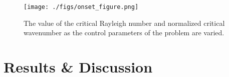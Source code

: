 \documentclass[twocolumn]{aastex61}
\begin{document}
\begin{figure}
\centering
\texttt{[image: ./figs/onset\_figure.png]}
\caption{The value of the critical Rayleigh number and normalized critical wavenumber
as the control parameters of the problem are varied. \label{fig:onset_curves}}
\end{figure}


\section{Results \& Discussion}
\label{sec:results}


\end{document}
